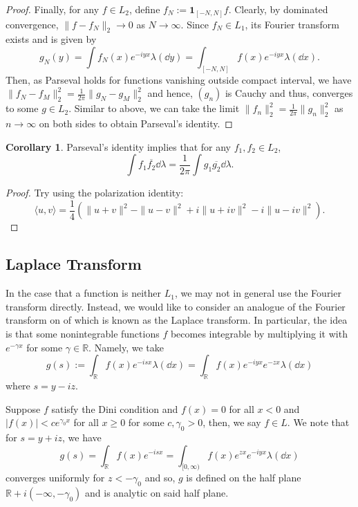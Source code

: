 \documentclass[]{article}
\theoremstyle{definition}
\newtheorem{corollary}{Corollary}[theorem]
\theoremstyle{definition}
\begin{document}
\begin{proof}
  Finally, for any \(f \in L_2\), define \(f_N := \mathbf{1}_{[-N, N]}f\). Clearly, 
  by dominated convergence, \(\|f - f_N\|_2 \to 0\) as \(N \to \infty\). 
  Since \(f_N \in L_1\), its Fourier transform exists and is given by
  \[g_N(y) = \int f_N(x)e^{-iyx}\lambda(\dd y) = \int_{[-N, N]} f(x)e^{-iyx}\lambda(\dd x).\]
  Then, as Parseval holds for functions vanishing outside compact interval, 
  we have \(\|f_N - f_M\|_2^2 = \frac{1}{2\pi}\|g_N - g_M\|_2^2\) and hence, 
  \((g_n)\) is Cauchy and thus, converges to some \(g \in L_2\). Similar to above, 
  we can take the limit \(\|f_n\|^2_2 = \frac{1}{2\pi}\|g_n\|^2_2\) as 
  \(n \to \infty\) on both sides to obtain Parseval's identity.
\end{proof}

\begin{corollary}
  Parseval's identity implies that for any \(f_1, f_2 \in L_2\), 
  \[\int f_1 \overline{f_2} \dd \lambda = 
    \frac{1}{2\pi}\int g_1 \overline{g_2} \dd \lambda.\]
\end{corollary}
\begin{proof}
  Try using the polarization identity:
  \[\langle u, v\rangle = \frac{1}{4}(\|u + v\|^2 - \|u - v\|^2 
  + i\|u + iv\|^2 - i\|u - iv\|^2).\]
\end{proof}

\subsection{Laplace Transform}

In the case that a function is neither \(L_1\), we may not in general
use the Fourier transform directly. Instead, we would like to consider an 
analogue of the Fourier transform on of which is known as the Laplace transform.
In particular, the idea is that some nonintegrable functions \(f\) becomes 
integrable by multiplying it with \(e^{-\gamma x}\) for some 
\(\gamma \in \mathbb{R}\). Namely, we take 
\[g(s) := \int_{\mathbb{R}} f(x)e^{-isx}\lambda(\dd x) 
  = \int_{\mathbb{R}}f(x)e^{-iyx}e^{-zx}\lambda(\dd x)\]
where \(s = y - i z\).

Suppose \(f\) satisfy the Dini condition and \(f(x) = 0\) for all \(x < 0\) 
and \(|f(x)| < ce^{\gamma_0 x}\) for all \(x \ge 0\) for some \(c, \gamma_0 > 0\),
then, we say \(f \in L\). We note that for \(s = y + iz\), we have
\[g(s) = \int_{\mathbb{R}} f(x) e^{-isx} = 
  \int_{[0, \infty)} f(x)e^{zx}e^{-iyx}\lambda(\dd x)\]
converges uniformly for \(z < -\gamma_0\) and so, \(g\) is defined 
on the half plane \(\mathbb{R} + i(-\infty, -\gamma_0)\) and is analytic on said 
half plane.
\end{document}
